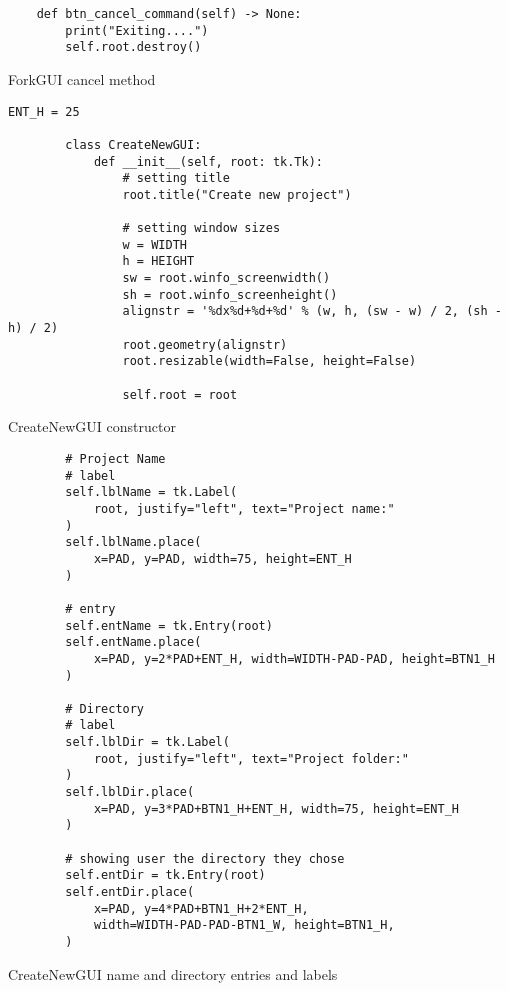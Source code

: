 \newpage
\begin{listing}[!ht]
    \begin{verbatim}
    def btn_cancel_command(self) -> None:
        print("Exiting....")
        self.root.destroy()
    \end{verbatim}
    \caption{ForkGUI cancel method}
    \label{sc:forkgui-cancel-method}
\end{listing}

\newpage
\begin{listing}[!ht]
    \begin{verbatim}
ENT_H = 25
        
        class CreateNewGUI:
            def __init__(self, root: tk.Tk):
                # setting title
                root.title("Create new project")
                
                # setting window sizes
                w = WIDTH
                h = HEIGHT
                sw = root.winfo_screenwidth()
                sh = root.winfo_screenheight()
                alignstr = '%dx%d+%d+%d' % (w, h, (sw - w) / 2, (sh - h) / 2)
                root.geometry(alignstr)
                root.resizable(width=False, height=False)
        
                self.root = root
    \end{verbatim}
    \caption{CreateNewGUI constructor}
    \label{sc:createnew-gui-construct}
\end{listing}

\newpage
\begin{listing}[!ht]
    \begin{verbatim}
        # Project Name
        # label
        self.lblName = tk.Label(
            root, justify="left", text="Project name:"
        )
        self.lblName.place(
            x=PAD, y=PAD, width=75, height=ENT_H
        )
        
        # entry
        self.entName = tk.Entry(root)
        self.entName.place(
            x=PAD, y=2*PAD+ENT_H, width=WIDTH-PAD-PAD, height=BTN1_H 
        )
        
        # Directory
        # label
        self.lblDir = tk.Label(
            root, justify="left", text="Project folder:"
        )
        self.lblDir.place(
            x=PAD, y=3*PAD+BTN1_H+ENT_H, width=75, height=ENT_H
        )
        
        # showing user the directory they chose
        self.entDir = tk.Entry(root)
        self.entDir.place(
            x=PAD, y=4*PAD+BTN1_H+2*ENT_H, 
            width=WIDTH-PAD-PAD-BTN1_W, height=BTN1_H,
        )
    \end{verbatim}
    \caption{CreateNewGUI name and directory entries and labels}
    \label{sc:createnew-gui-entries-labels}
\end{listing}

